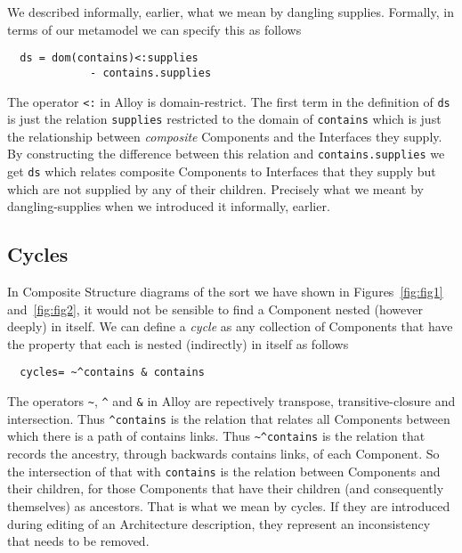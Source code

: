 \documentclass[a4paper,twoside]{article}
\begin{document}
\noindent We described informally, earlier, what we mean by dangling supplies. Formally, in terms of our metamodel we can specify this as follows
\begin{small}
\begin{verbatim}
  ds = dom(contains)<:supplies 
             - contains.supplies
\end{verbatim}
\end{small}
The operator {\small\verb$<:$} in Alloy is domain-restrict. The first term in the definition of {\small\verb$ds$} is just the relation {\small\verb$supplies$} restricted to the domain of {\small\verb$contains$} which is just the relationship between {\em composite} Components and the Interfaces they supply. By constructing the difference between this relation and {\small\verb$contains.supplies$} we get {\small\verb$ds$} which relates composite Components to Interfaces that they supply but which are not supplied by any of their children. Precisely what we meant by dangling-supplies when we introduced it informally, earlier.

\subsection{Cycles}

\noindent In Composite Structure diagrams of the sort we have shown in Figures~\ref{fig:fig1} and~\ref{fig:fig2}, it would not be sensible to find a Component nested (however deeply) in itself. We can define a {\em cycle} as any collection of Components that have the property that each is nested (indirectly) in itself as follows
\begin{small}
\begin{verbatim}
  cycles= ~^contains & contains
\end{verbatim}
\end{small}
The operators \verb$~$, \verb$^$  and \verb$&$ in Alloy are repectively transpose, transitive-closure and intersection. Thus \verb$^contains$ is the relation that relates all Components between which there is a path of contains links. Thus \verb$~^contains$ is the relation that records the ancestry, through backwards contains links, of  each  Component. So the intersection of that with {\small\verb$contains$} is the relation between Components and their children, for those Components that have their children (and consequently themselves) as ancestors. That is what we mean by cycles. If they are introduced during editing of an Architecture description, they represent an inconsistency that needs to be removed.
 
\end{document}
